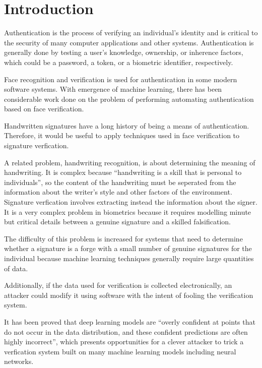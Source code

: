 \section{Introduction}\label{sec:introduction}

Authentication is the process of verifying an individual's identity and is critical to the security of many computer applications and other systems.
Authentication is generally done by testing a user's knowledge, ownership, or inherence factors, which could be a password, a token, or a biometric identifier, respectively\cite{authentication}.

Face recognition and verification is used for authentication in some modern software systems.
With emergence of machine learning, there has been considerable work done on the problem of performing automating authentication based on face verification\cite{sig_net}.

Handwritten signatures have a long history of being a means of authentication\cite{handwriting_survey}.
Therefore, it would be useful to apply techniques used in face verification to signature verfication.

A related problem, handwriting recognition, is about determining the meaning of handwriting\cite{handwriting_survey}.
It is complex because ``handwriting is a skill that is personal to individuals'', so the content of the handwriting must be seperated from the information about the writer's style and other factors of the environment\cite{handwriting_survey}.
Signature verfication involves extracting instead the information about the signer.
It is a very complex problem in biometrics because it requires modelling minute but critical details between a genuine signature and a skilled falsification\cite{sig_net}.

The difficulty of this problem is increased for systems that need to determine whether a signature is a forge with a small number of genuine signatures for the individual because machine learning techniques generally require large quantities of data\cite{handwriting_survey}.

Additionally, if the data used for verification is collected electronically, an attacker could modify it using software with the intent of fooling the verification system.

It has been proved that deep learning models are ``overly confident at points that do not occur in the data distribution, and these confident predictions are often highly incorrect'', which presents opportunities for a clever attacker to trick a verfication system built on many machine learning models including neural networks\cite{goodfellow}.

